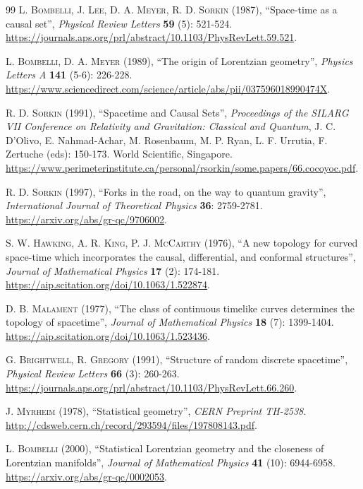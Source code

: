 \documentclass{article}
\begin{document}
\begin{thebibliography}{99}
\textsc{L. Bombelli, J. Lee, D. A. Meyer, R. D. Sorkin} (1987), ``Space-time as a causal set'', \textit{Physical Review Letters} \textbf{59} (5): 521-524. \url{https://journals.aps.org/prl/abstract/10.1103/PhysRevLett.59.521}.

\textsc{L. Bombelli, D. A. Meyer} (1989), ``The origin of Lorentzian geometry'', \textit{Physics Letters A} \textbf{141} (5-6): 226-228. \url{https://www.sciencedirect.com/science/article/abs/pii/037596018990474X}.

\textsc{R. D. Sorkin} (1991), ``Spacetime and Causal Sets'', \textit{Proceedings of the SILARG VII Conference on Relativity and Gravitation: Classical and Quantum}, J. C. D'Olivo, E. Nahmad-Achar, M. Rosenbaum, M. P. Ryan, L. F. Urrutia, F. Zertuche (eds): 150-173. World Scientific, Singapore. \url{https://www.perimeterinstitute.ca/personal/rsorkin/some.papers/66.cocoyoc.pdf}.

\textsc{R. D. Sorkin} (1997), ``Forks in the road, on the way to quantum gravity'', \textit{International Journal of Theoretical Physics} \textbf{36}: 2759-2781. \url{https://arxiv.org/abs/gr-qc/9706002}.

\textsc{S. W. Hawking, A. R. King, P. J. McCarthy} (1976), ``A new topology for curved space-time which incorporates the causal, differential, and conformal structures'', \textit{Journal of Mathematical Physics} \textbf{17} (2): 174-181. \url{https://aip.scitation.org/doi/10.1063/1.522874}.

\textsc{D. B. Malament} (1977), ``The class of continuous timelike curves determines the topology of spacetime'', \textit{Journal of Mathematical Physics} \textbf{18} (7): 1399-1404. \url{https://aip.scitation.org/doi/10.1063/1.523436}.

\textsc{G. Brightwell, R. Gregory} (1991), ``Structure of random discrete spacetime'', \textit{Physical Review Letters} \textbf{66} (3): 260-263. \url{https://journals.aps.org/prl/abstract/10.1103/PhysRevLett.66.260}.

\textsc{J. Myrheim} (1978), ``Statistical geometry'', \textit{CERN Preprint TH-2538}. \url{http://cdsweb.cern.ch/record/293594/files/197808143.pdf}.

\textsc{L. Bombelli} (2000), ``Statistical Lorentzian geometry and the closeness of Lorentzian manifolds'', \textit{Journal of Mathematical Physics} \textbf{41} (10): 6944-6958. \url{https://arxiv.org/abs/gr-qc/0002053}.


\end{thebibliography}
\end{document}

